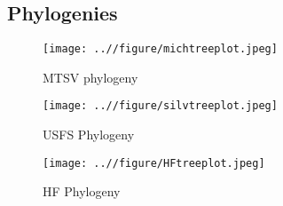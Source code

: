 \documentclass[12pt]{article}\usepackage[]{graphicx}\usepackage[]{color}
\begin{document}
\subsection*{Phylogenies}
 \begin{figure}[h!]
    \centering
    \texttt{[image: ..//figure/michtreeplot.jpeg]}
    \caption{MTSV phylogeny}
    \label{fig:Figure S3}
    \end{figure}
    
     \begin{figure}
    \centering
    \texttt{[image: ..//figure/silvtreeplot.jpeg]}
    \caption{USFS Phylogeny}
    \label{fig:Figure S4}
    \end{figure}
    
    \begin{figure}
    \centering
    \texttt{[image: ..//figure/HFtreeplot.jpeg]}
    \caption{HF Phylogeny}
    \label{fig:Figure S5}
    \end{figure}
\end{document}
